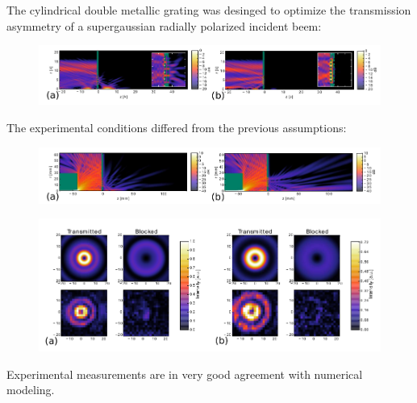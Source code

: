 \documentclass{beamer}
\begin{document}
\begin{frame}
	The cylindrical double metallic grating was desinged to optimize the transmission asymmetry of a supergaussian radially polarized incident beem:
	\begin{figure}[htb]
		\includegraphics[width=\textwidth]{../images/dmg/express_high_contrast.png}\\
	\end{figure}
	The experimental conditions differed from the previous assumptions:
	\begin{figure}[htb]
		\includegraphics[width=\textwidth]{../images/dmg/express_zarmata.png}\\
	\end{figure}
		
\end{frame}

\begin{frame}
	\begin{figure}[htb]
		\includegraphics[width=\textwidth]{../images/dmg/express_exp.png}\\
	\end{figure}
	Experimental measurements are in very good agreement with numerical modeling.
		
\end{frame}
\end{document}
